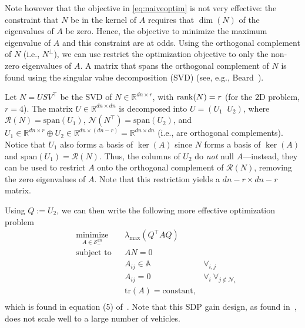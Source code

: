 \documentclass[a4paper]{article}
\begin{document}
Note however that the objective in \eqref{eq:naiveoptim} is not very effective: the constraint that $N$ be in the kernel of $A$ requires that $\dim(N)$ of the eigenvalues of $A$ be zero.
Hence, the objective to minimize the maximum eigenvalue of $A$ and this constraint are at odds.
Using the orthogonal complement of $N$ (i.e., $N^\perp$), we can use restrict the optimization objective to only the non-zero eigenvalues of $A$.
A matrix that spans the orthogonal complement of $N$ is found using the singular value decomposition (SVD) (see, e.g., Beard~\cite{Beard2002}).

Let $N=USV^\top$ be the SVD of $N\in\mathbb{R}^{dn \times r}$, with $\rank(N)=r$ (for the 2D problem, $r=4$).
The matrix $U\in\mathbb{R}^{dn\times dn}$ is decomposed into $U = \left(U_1 \;\; U_2\right)$, where $\mathcal{R}(N) = \text{span}(U_1)$, $\mathcal{N}(N^\top)=\text{span}(U_2)$, and $U_1\in\mathbb{R}^{dn\times r}\oplus U_2\in\mathbb{R}^{dn\times (dn-r)} = \mathbb{R}^{dn\times dn}$ (i.e., are orthogonal complements).
Notice that $U_1$ also forms a basis of $\ker(A)$ since $N$ forms a basis of $\ker(A)$ and $\text{span}(U_1) = \mathcal{R}(N)$.
Thus, the columns of $U_2$ do \textit{not} null $A$---instead, they can be used to restrict $A$ onto the orthogonal complement of $\mathcal{R}(N)$, removing the zero eigenvalues of $A$.
Note that this restriction yields a $dn-r \times dn-r$ matrix.

Using $Q:=U_2$, we can then write the following more effective optimization problem
\begin{equation} \label{eq:sdpgain}
\begin{aligned}
& \underset{A\in\mathcal{S}^{dn}_-}{\text{minimize}}
& & \lambda_{\text{max}} \left( Q^\top A Q \right) & \\
& \text{subject to}
& & AN = 0 & \\
&&& A_{ij} \in \mathbb{A}  & \forall_{i,j} \\
&&& A_{ij} = 0 \;   & \forall_{i} \ \forall_{j \notin \mathcal{N}_i} \\
&&& \text{tr}(A) = \text{constant}, \\
\end{aligned}
\end{equation}
which is found in equation (5) of~\cite{Lusk2020formation}.
Note that this SDP gain design, as found in~\cite{Fathian2019}, does not scale well to a large number of vehicles.

\end{document}
